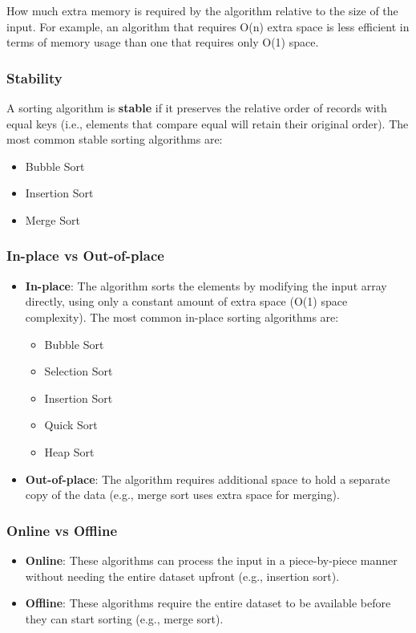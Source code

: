 How much extra memory is required by the algorithm relative to the size of the input. For example, an algorithm that requires O(n) extra space is less efficient in terms of memory usage than one that requires only O(1) space.

\subsubsection*{Stability}

A sorting algorithm is \textbf{stable} if it preserves the relative order of records with equal keys (i.e., elements that compare equal will retain their original order). The most common stable sorting algorithms are:
\begin{itemize}
    \item Bubble Sort
    \item Insertion Sort
    \item Merge Sort
\end{itemize}

\subsubsection*{In-place vs Out-of-place}

\begin{itemize}
    \item \textbf{In-place}: The algorithm sorts the elements by modifying the input array directly, using only a constant amount of extra space (O(1) space complexity). The most common in-place sorting algorithms are:
    \begin{itemize}
        \item Bubble Sort
        \item Selection Sort
        \item Insertion Sort
        \item Quick Sort
        \item Heap Sort
    \end{itemize}
    \item \textbf{Out-of-place}: The algorithm requires additional space to hold a separate copy of the data (e.g., merge sort uses extra space for merging).
\end{itemize}

\subsubsection*{Online vs Offline}

\begin{itemize}
    \item \textbf{Online}: These algorithms can process the input in a piece-by-piece manner without needing the entire dataset upfront (e.g., insertion sort).
    \item \textbf{Offline}: These algorithms require the entire dataset to be available before they can start sorting (e.g., merge sort).
\end{itemize}

